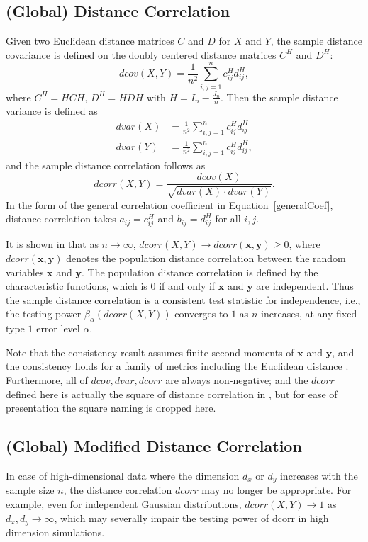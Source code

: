 \documentclass[11pt]{article}
\providecommand{\mb}[1]{\boldsymbol{#1}}
\begin{document}
\subsection{(Global) Distance Correlation}
\label{appen:dcorr}
Given two Euclidean distance matrices $C$ and $D$ for $X$ and $Y$, the sample distance covariance is defined on the doubly centered distance matrices $C^{H}$ and $D^{H}$:
\begin{equation}
\label{dcovEqu}
dcov(X,Y)=\frac{1}{n^2}\sum_{i,j=1}^{n}c^{H}_{ij}d^{H}_{ij},
\end{equation}
where $C^{H}=HCH$, $D^{H}=HDH$ with $H=I_{n}-\frac{J_{n}}{n}$. Then the sample distance variance is defined as
\begin{align*}
dvar(X) &=\frac{1}{n^2}\sum_{i,j=1}^{n}c^{H}_{ij}d^{H}_{ij}\\
dvar(Y) &=\frac{1}{n^2}\sum_{i,j=1}^{n}c^{H}_{ij}d^{H}_{ij},
\end{align*}
and the sample distance correlation follows as
\begin{equation}
\label{dcorrEqu}
dcorr(X,Y)=\frac{dcov(X)}{\sqrt{dvar(X) \cdot dvar(Y)}}.
\end{equation}
In the form of the general correlation coefficient in Equation~\ref{generalCoef}, distance correlation takes $a_{ij}=c^{H}_{ij}$ and $b_{ij}=d^{H}_{ij}$ for all $i,j$.

It is shown in \cite{SzekelyRizzoBakirov2007} that as $n \rightarrow \infty$, $dcorr(X,Y) \rightarrow dcorr(\mb{x},\mb{y}) \geq 0$, where $dcorr(\mb{x},\mb{y})$ denotes the population distance correlation between the random variables $\mb{x}$ and $\mb{y}$. The population distance correlation is defined by the characteristic functions, which is $0$ if and only if $\mb{x}$ and $\mb{y}$ are independent. Thus the sample distance correlation is a consistent test statistic for independence, i.e., the testing power $\beta_{\alpha}(dcorr(X,Y))$ converges to $1$ as $n$ increases, at any fixed type $1$ error level $\alpha$. 

Note that the consistency result assumes finite second moments of $\mb{x}$ and $\mb{y}$, and the consistency holds for a family of metrics including the Euclidean distance \cite{Lyons2013}. Furthermore, all of $dcov, dvar, dcorr$ are always non-negative; and the $dcorr$ defined here is actually the square of distance correlation in \cite{SzekelyRizzoBakirov2007}, but for ease of presentation the square naming is dropped here.

\subsection{(Global) Modified Distance Correlation}
\label{appen:mcorr}
In case of high-dimensional data where the dimension $d_{x}$ or $d_{y}$ increases with the sample size $n$, the distance correlation $dcorr$ may no longer be appropriate. For example, even for independent Gaussian distributions, $dcorr(X,Y) \rightarrow 1$ as $d_{x}, d_{y} \rightarrow \infty$, which may severally impair the testing power of dcorr in high dimension simulations.
\end{document}

